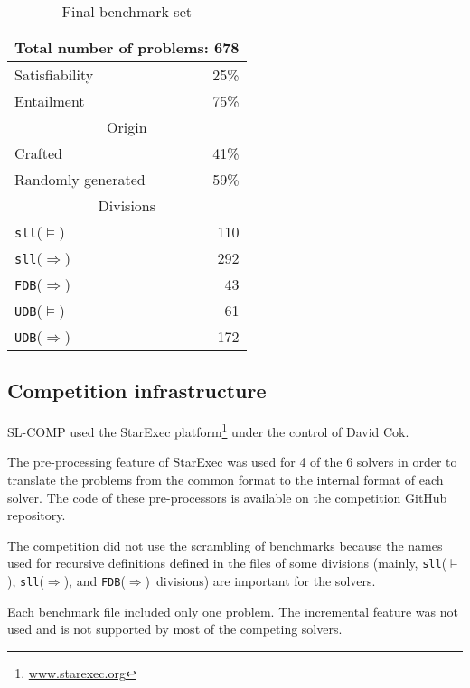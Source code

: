 \documentclass[twoside,11pt]{article}
\newcommand{\limp}{\Rightarrow}
\newcommand{\sllsat}{\texttt{sll}($\models$)}
\newcommand{\sllent}{\texttt{sll}($\limp$)}
\newcommand{\FDBent}{\texttt{FDB}($\limp$)}
\newcommand{\UDBsat}{\texttt{UDB}($\models$)}
\newcommand{\UDBent}{\texttt{UDB}($\limp$)}
\begin{document}
\begin{table}
\begin{center}
\begin{tabular}{p{6cm}r}\hline
\multicolumn{2}{c}{Total number of problems: 678} \\
\hline
Satisfiability & 25\% \\
Entailment & 75\% \\
\hline
%
\hline
\multicolumn{2}{c}{Origin} \\
\hline
Crafted & 41\% \\
Randomly generated & 59\% \\
\hline
%
\hline
\multicolumn{2}{c}{Divisions} \\
\hline
\sllsat & 110 \\ %
\sllent & 292 \\ %
\FDBent &  43 \\ %
\UDBsat &  61 \\ %
\UDBent & 172 \\
\hline
\end{tabular}
\end{center}
\caption{Final benchmark set}
\label{tab:bench}
\end{table}



\subsection{Competition infrastructure}

SL-COMP used the StarExec platform\footnote{\url{www.starexec.org}} under the control of David Cok. 

The pre-processing feature of StarExec was used for 4 of the 6 solvers in order to translate the problems from the common format to the internal format of each solver. The code of these pre-processors is available on the competition GitHub repository.

The competition did not use the scrambling of benchmarks because the names used for recursive definitions defined in the files of some divisions (mainly, \sllsat, \sllent, and \FDBent\ divisions) are important for the solvers.

Each benchmark file included only one problem. 
The incremental feature was not used and is not supported by most of the competing solvers.
\end{document}
